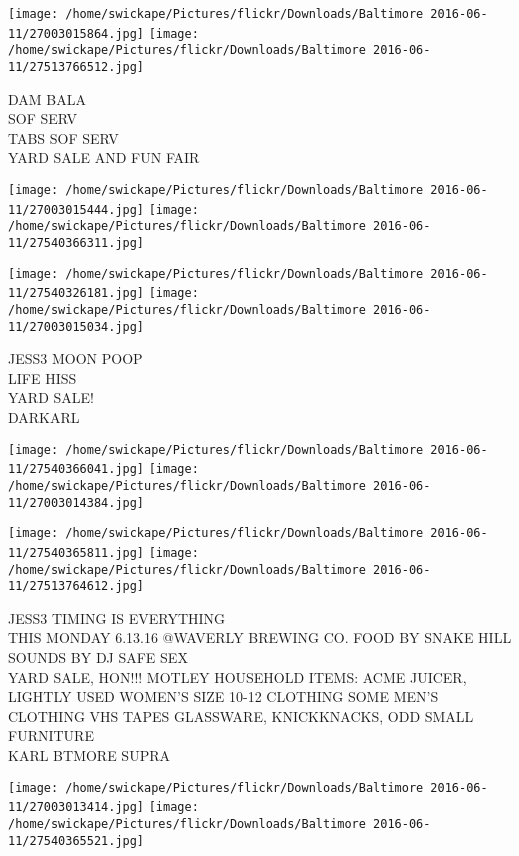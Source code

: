 \documentclass[10pt,letterpaper]{article}
\begin{document}
\texttt{[image: /home/swickape/Pictures/flickr/Downloads/Baltimore 2016-06-11/27003015864.jpg]}
\texttt{[image: /home/swickape/Pictures/flickr/Downloads/Baltimore 2016-06-11/27513766512.jpg]}

DAM BALA\\
SOF SERV\\
TABS SOF SERV\\
YARD SALE AND FUN FAIR\\
\pagebreak

\texttt{[image: /home/swickape/Pictures/flickr/Downloads/Baltimore 2016-06-11/27003015444.jpg]}
\texttt{[image: /home/swickape/Pictures/flickr/Downloads/Baltimore 2016-06-11/27540366311.jpg]}

\texttt{[image: /home/swickape/Pictures/flickr/Downloads/Baltimore 2016-06-11/27540326181.jpg]}
\texttt{[image: /home/swickape/Pictures/flickr/Downloads/Baltimore 2016-06-11/27003015034.jpg]}

JESS3 MOON POOP\\
LIFE HISS\\
YARD SALE!\\
DARKARL\\
\pagebreak

\texttt{[image: /home/swickape/Pictures/flickr/Downloads/Baltimore 2016-06-11/27540366041.jpg]}
\texttt{[image: /home/swickape/Pictures/flickr/Downloads/Baltimore 2016-06-11/27003014384.jpg]}

\texttt{[image: /home/swickape/Pictures/flickr/Downloads/Baltimore 2016-06-11/27540365811.jpg]}
\texttt{[image: /home/swickape/Pictures/flickr/Downloads/Baltimore 2016-06-11/27513764612.jpg]}

JESS3 TIMING IS EVERYTHING\\
THIS MONDAY 6.13.16 @WAVERLY BREWING CO. FOOD BY SNAKE HILL SOUNDS BY DJ SAFE SEX\\
YARD SALE, HON!!! MOTLEY HOUSEHOLD ITEMS: ACME JUICER, LIGHTLY USED WOMEN'S SIZE 10{-}12 CLOTHING SOME MEN'S CLOTHING VHS TAPES GLASSWARE, KNICKKNACKS, ODD SMALL FURNITURE\\
KARL BTMORE SUPRA\\
\pagebreak

\texttt{[image: /home/swickape/Pictures/flickr/Downloads/Baltimore 2016-06-11/27003013414.jpg]}
\texttt{[image: /home/swickape/Pictures/flickr/Downloads/Baltimore 2016-06-11/27540365521.jpg]}
\end{document}
